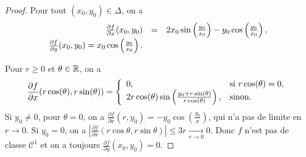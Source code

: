 \documentclass[12pt]{article}
\begin{document}
\begin{proof}
	Pour tout $(x_0,y_0)\in\Delta$, on a 
	\begin{equation}
		\begin{array}[]{rcl}
			\frac{\partial f}{\partial x}(x_0,y_0) &=&2x_0\sin\left(\frac{y_0}{x_0}\right)-y_0\cos\left(\frac{y_0}{x_0}\right),\\
			\frac{\partial f}{\partial y}(x_0,y_0)=x_0\cos\left(\frac{y_0}{x_0}\right).
		\end{array}
	\end{equation}

	Pour $r\geqslant0$ et $\theta\in\mathbb{R}$, on a 
	\begin{equation}
		\frac{\partial f}{\partial x}(r\cos(\theta),r\sin(\theta))=
		\left\lbrace
			\begin{array}[]{ll}
				0, &\text{si }r\cos(\theta)=0,\\
				2r\cos(\theta)\sin\left(\frac{y_0+r\sin(\theta)}{r\cos(\theta)}\right),&\text{sinon.}
			\end{array}
		\right.
	\end{equation}
	Si $y_0\neq0$, pour $\theta=0$, on a $\frac{\partial f}{\partial x}(r,y_0)=-y_0\cos\left(\frac{y_0}{x}\right)$, qui n'a pas de limite en $r\to0$. Si $y_0=0$, on a $\left\lvert\frac{\partial f}{\partial x}(r\cos\theta,r\sin\theta)\right\rvert\leqslant 3r\xrightarrow[r\to0]{}0$. Donc $f$ n'est pas de classe $\mathcal{C}^{1}$ et on a toujours $\frac{\partial f}{\partial y}(x_0,y_0)=0$.
\end{proof}
\end{document}
